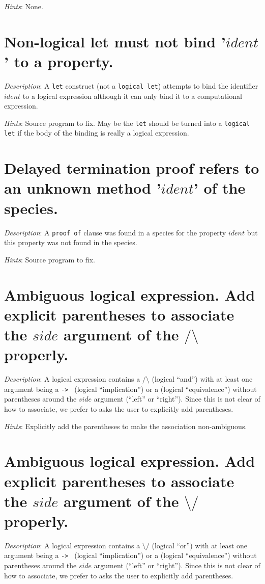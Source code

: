 {\em Hints}: None.



\section*{Non-logical let must not bind '$ident$' to a property.}
{\em Description}: A {\tt let} construct (not a {\tt logical let})
attempts to bind the identifier $ident$ to a logical expression
although it can only bind it to a computational expression.

{\em Hints}: Source program to fix. May be the {\tt let} should be
turned into a {\tt logical let} if the body of the binding is really a
logical expression.



\section*{Delayed termination proof refers to an unknown method
  '$ident$' of the species.}
{\em Description}: A {\tt proof of} clause was found in a species for
the property $ident$ but this property was not found in the species.

{\em Hints}: Source program to fix.



\section*{Ambiguous logical expression. Add explicit parentheses to
  associate the $side$ argument of the $/\setminus$ properly.}
{\em Description}: A logical expression contains a
{\tt $/\setminus$} (logical ``and'') with at least one argument being a
{\tt -> } (logical ``implication'') or a {\tt <->} (logical
``equivalence'') without parentheses around the $side$ argument (``left''
or ``right''). Since this is not clear of how to associate, we prefer
to asks the user to explicitly add parentheses.

{\em Hints}: Explicitly add the parentheses to make the association
non-ambiguous.



\section*{Ambiguous logical expression. Add explicit parentheses to
  associate the $side$ argument of the {\tt $\setminus/$} properly.}
{\em Description}: A logical expression contains a
{\tt $\setminus/$} (logical ``or'') with at least one argument being a
{\tt -> } (logical ``implication'') or a {\tt <->} (logical
``equivalence'') without parentheses around the $side$ argument (``left''
or ``right''). Since this is not clear of how to associate, we prefer
to asks the user to explicitly add parentheses.

